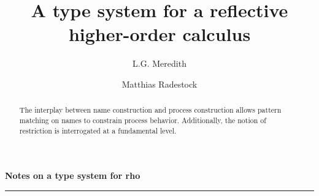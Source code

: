 \documentclass[]{amsart}
\theoremstyle{definition}
\theoremstyle{remark}
\numberwithin{equation}{subsection}
\newcommand{\papertitle}{A type system for a reflective higher-order calculus}
\newcommand{\paperversion}{Draft Version 0.1 - December 21, 2004}
\begin{document}
\setlength{\topmargin}{0in}
\setlength{\textheight}{8.5in}
\setlength{\parskip}{6pt}

\title{\papertitle}

\author{ L.G. Meredith }
\author{ Matthias Radestock }







\dedicatory{}



\begin{abstract}
\normalsize{ 

The interplay between name construction and process construction
allows pattern matching on names to constrain process
behavior. Additionally, the notion of restriction is interrogated at a
fundamental level.

}

\end{abstract}

\noindent
{\large \textbf{Notes on a type system for rho}}\\
\rule{6.25in}{0.75pt}\\\\\\

\maketitle

\end{document}
